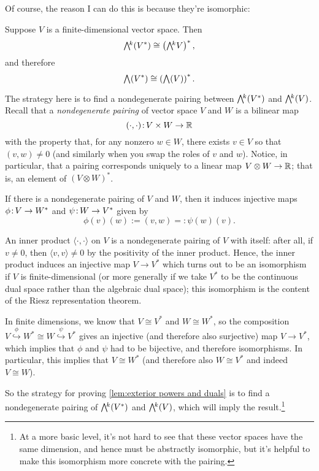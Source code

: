 Of course, the reason I can do this is because they're isomorphic:

\begin{lemma}\label{lem:exterior powers and duals}
	Suppose $V$ is a finite-dimensional vector space. Then
	\[
		\ext{k}(V^\ast) \cong \left(\ext{k} V\right)^\ast,
	\]
	and therefore
	\[
		\ext{}(V^\ast) \cong \left(\ext{}(V)\right)^\ast.
	\]
\end{lemma}

The strategy here is to find a nondegenerate pairing between $\ext{k}(V^\ast)$ and $\ext{k} (V)$. Recall that a \emph{nondegenerate pairing} of vector space $V$ and $W$ is a bilinear map
\[
	(\cdot , \cdot ) \colon\thinspace\!\! V \times W \to \mathbb{R}
\]
with the property that, for any nonzero $w \in W$, there exists $v \in V$ so that $(v,w) \neq 0$ (and similarly when you swap the roles of $v$ and $w$). Notice, in particular, that a pairing corresponds uniquely to a linear map $V \otimes W \to \mathbb{R}$; that is, an element of $(V \otimes W)^\ast$.

If there is a nondegenerate pairing of $V$ and $W$, then it induces injective maps $\phi \colon\thinspace\!\! V \to W^\ast$ and $\psi \colon\thinspace\!\! W \to V^\ast$ given by
\[
	\phi(v)(w) := (v,w) =: \psi(w)(v).
\]

\begin{example}
	An inner product $\langle \cdot , \cdot \rangle$ on $V$ is a nondegenerate pairing of $V$ with itself: after all, if $v \neq 0$, then $\langle v , v \rangle \neq 0$ by the positivity of the inner product. Hence, the inner product induces an injective map $V \to V^\ast$ which turns out to be an isomorphism if $V$ is finite-dimensional (or more generally if we take $V^\ast$ to be the continuous dual space rather than the algebraic dual space); this isomorphism is the content of the Riesz representation theorem.
\end{example}

In finite dimensions, we know that $V \cong V^\ast$ and $W \cong W^\ast$, so the composition $V \overset{\phi}{\hookrightarrow} W^\ast \cong W \overset{\psi}{\hookrightarrow} V^\ast$ gives an injective (and therefore also surjective) map $V \to V^\ast$, which implies that $\phi$ and $\psi$ had to be bijective, and therefore isomorphisms. In particular, this implies that $V \cong W^\ast$ (and therefore also $W \cong V^\ast$ and indeed $V \cong W$).

So the strategy for proving \cref{lem:exterior powers and duals} is to find a nondegenerate pairing of $\ext{k}(V^\ast)$ and $\ext{k}(V)$, which will imply the result.\footnote{At a more basic level, it's not hard to see that these vector spaces have the same dimension, and hence must be abstractly isomorphic, but it's helpful to make this isomorphism more concrete with the pairing.}


